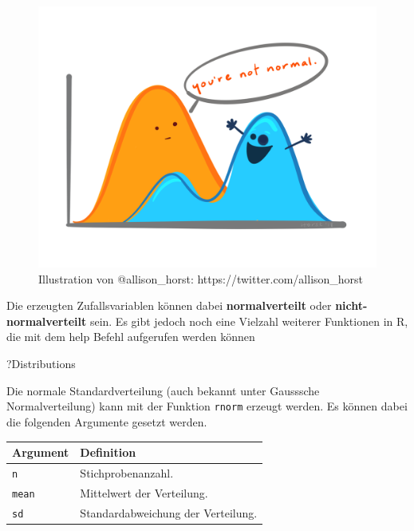 \documentclass[
]{article}
\newenvironment{Shaded}{\begin{snugshade}}{\end{snugshade}}
\newcommand{\NormalTok}[1]{#1}
\begin{document}
\begin{figure}

{\centering \includegraphics[width=1\linewidth]{images/017} 

}

\caption{Illustration von @allison_horst: https://twitter.com/allison_horst}\label{fig:unnamed-chunk-76}
\end{figure}

Die erzeugten Zufallsvariablen können dabei \textbf{normalverteilt} oder \textbf{nicht-normalverteilt} sein. Es gibt jedoch noch eine Vielzahl weiterer Funktionen in R, die mit dem help Befehl aufgerufen werden können

\begin{Shaded}
\begin{Highlighting}[]
\NormalTok{?Distributions}
\end{Highlighting}
\end{Shaded}

Die normale Standardverteilung (auch bekannt unter Gausssche Normalverteilung) kann mit der Funktion \texttt{rnorm} erzeugt werden. Es können dabei die folgenden Argumente gesetzt werden.

\begin{longtable}[]{@{}ll@{}}
\toprule
Argument & Definition \\
\midrule
\endhead
\texttt{n} & Stichprobenanzahl. \\
\texttt{mean} & Mittelwert der Verteilung. \\
\texttt{sd} & Standardabweichung der Verteilung. \\
\bottomrule
\end{longtable}
\end{document}
